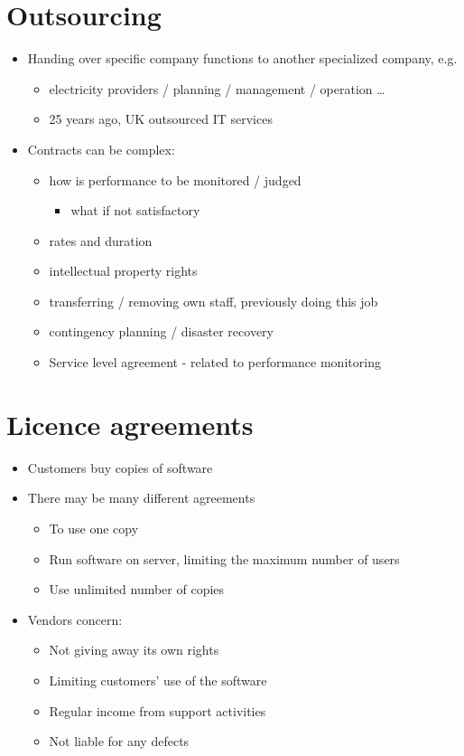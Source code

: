 \documentclass{article}
\begin{document}
\section{Outsourcing}
\begin{itemize}
\item Handing over specific company functions to another specialized company, e.g.
\begin{itemize}
\item electricity providers / planning / management / operation \ldots 
\item 25 years ago, UK outsourced IT services
\end{itemize}
\item Contracts can be complex:
\begin{itemize}
\item how is performance to be monitored / judged
\begin{itemize}
\item what if not satisfactory
\end{itemize}
\item rates and duration
\item intellectual property rights 
\item transferring / removing own staff, previously doing this job
\item contingency planning / disaster recovery
\item Service level agreement - related to performance monitoring
\end{itemize}
\end{itemize}



\section{Licence agreements}
\begin{itemize}
\item Customers buy copies of software
\item There may be many different agreements
\begin{itemize}
\item To use one copy
\item Run software on server, limiting the maximum number of users
\item Use unlimited number of copies
\end{itemize}
\item Vendors concern:
\begin{itemize}
\item Not giving away its own rights
\item Limiting customers' use of the software
\item Regular income from support activities
\item Not liable for any defects
\end{itemize}
\end{itemize}
\end{document}
